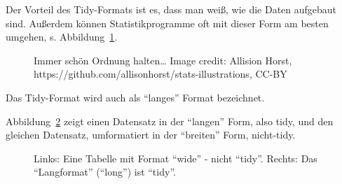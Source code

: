 \documentclass[
  a4paper,
  DIV=11]{scrreprt}
\theoremstyle{definition}
\theoremstyle{definition}
\theoremstyle{definition}
\theoremstyle{remark}
\begin{document}
Der Vorteil des Tidy-Formats ist es, dass man weiß, wie die Daten
aufgebaut sind. Außerdem können Statistikprogramme oft mit dieser Form
am besten umgehen, s. Abbildung~\ref{fig-tidy3}.

\begin{figure}


\caption{\label{fig-tidy3}Immer schön Ordnung halten\ldots{} Image
credit: Allision Horst,
https://github.com/allisonhorst/stats-illustrations, CC-BY}

\end{figure}%

Das Tidy-Format wird auch als ``langes'' Format bezeichnet.

Abbildung~\ref{fig-long-wide-anim} zeigt einen Datensatz in der
``langen'' Form, also tidy, und den gleichen Datensatz, umformatiert in
der ``breiten'' Form, nicht-tidy.

\begin{figure}


\caption{\label{fig-long-wide-anim}Links: Eine Tabelle mit Format
``wide'' - nicht ``tidy''. Rechts: Das ``Langformat'' (``long'') ist
``tidy''.}

\end{figure}%
\end{document}
